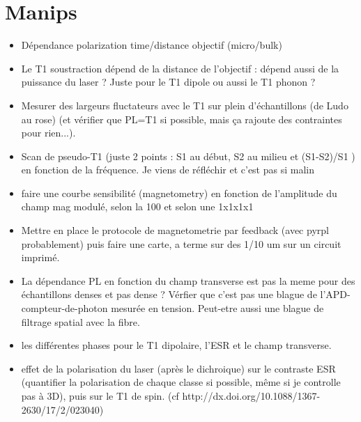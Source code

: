 \documentclass[a4paper]{report}
\begin{document}
 \section{Manips}
 \begin{itemize}
 \item Dépendance polarization time/distance objectif (micro/bulk)
 \item Le T1 soustraction dépend de la distance de l'objectif : dépend aussi de la puissance du laser ? Juste pour le T1 dipole ou aussi le T1 phonon ?
 \item Mesurer des largeurs fluctateurs avec le T1 sur plein d'échantillons (de Ludo au rose) (et vérifier que PL=T1 si possible, mais ça rajoute des contraintes pour rien...).
 \item Scan de pseudo-T1 (juste 2 points : S1 au début, S2 au milieu et (S1-S2)/S1 ) en fonction de la fréquence. Je viens de réfléchir et c'est pas si malin

 \item faire une courbe sensibilité (magnetometry) en fonction de l'amplitude du champ mag modulé, selon la 100 et selon une 1x1x1x1
 \item Mettre en place le protocole de magnetometrie par feedback (avec pyrpl probablement) puis faire une carte, a terme sur des 1/10 um sur un circuit imprimé.
 \item La dépendance PL en fonction du champ transverse est pas la meme pour des échantillons denses et pas dense ? Vérfier que c'est pas une blague de l'APD-compteur-de-photon mesurée en tension. Peut-etre aussi une blague de filtrage spatial avec la fibre.
 \item les différentes phases pour le T1 dipolaire, l'ESR et le champ transverse.
 \item effet de la polarisation du laser (après le dichroique) sur le contraste ESR (quantifier la polarisation de chaque classe si possible, même si je controlle pas à 3D), puis sur le T1 de spin. (cf http://dx.doi.org/10.1088/1367-2630/17/2/023040)
 \end{itemize}
 
\end{document}

